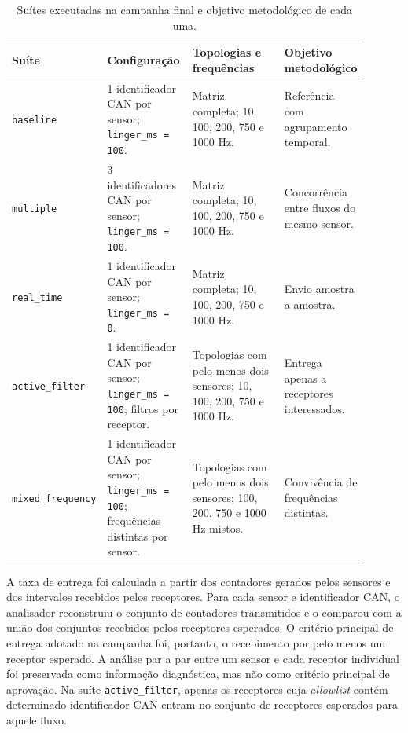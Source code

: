 \begin{table}[htbp]
\centering
\scriptsize
\setlength{\tabcolsep}{3pt}
\renewcommand{\arraystretch}{1.16}
\begin{tabular}{p{0.17\linewidth}|p{0.24\linewidth}|p{0.27\linewidth}|p{0.22\linewidth}}
\hline
Suíte & Configuração & Topologias e frequências & Objetivo metodológico \\
\hline
\texttt{baseline} & 1 identificador CAN por sensor; \texttt{linger\_ms = 100}. & Matriz completa; 10, 100, 200, 750 e 1000 Hz. & Referência com agrupamento temporal. \\
\hline
\texttt{multiple} & 3 identificadores CAN por sensor; \texttt{linger\_ms = 100}. & Matriz completa; 10, 100, 200, 750 e 1000 Hz. & Concorrência entre fluxos do mesmo sensor. \\
\hline
\texttt{real\_time} & 1 identificador CAN por sensor; \texttt{linger\_ms = 0}. & Matriz completa; 10, 100, 200, 750 e 1000 Hz. & Envio amostra a amostra. \\
\hline
\texttt{active\_filter} & 1 identificador CAN por sensor; \texttt{linger\_ms = 100}; filtros por receptor. & Topologias com pelo menos dois sensores; 10, 100, 200, 750 e 1000 Hz. & Entrega apenas a receptores interessados. \\
\hline
\texttt{mixed\_frequency} & 1 identificador CAN por sensor; \texttt{linger\_ms = 100}; frequências distintas por sensor. & Topologias com pelo menos dois sensores; 100, 200, 750 e 1000 Hz mistos. & Convivência de frequências distintas. \\
\hline
\end{tabular}
\caption{Suítes executadas na campanha final e objetivo metodológico de cada uma.}
\label{tab:suites-executadas}
\end{table}

A taxa de entrega foi calculada a partir dos contadores gerados pelos sensores e
dos intervalos recebidos pelos receptores. Para cada sensor e identificador CAN,
o analisador reconstruiu o conjunto de contadores transmitidos e o comparou com
a união dos conjuntos recebidos pelos receptores esperados. O critério principal
de entrega adotado na campanha foi, portanto, o recebimento por pelo menos um
receptor esperado. A análise par a par entre um sensor e cada receptor individual
foi preservada como informação diagnóstica, mas não como critério principal de
aprovação. Na suíte \texttt{active\_filter}, apenas os receptores cuja
\emph{allowlist} contém determinado identificador CAN entram no conjunto de
receptores esperados para aquele fluxo.

